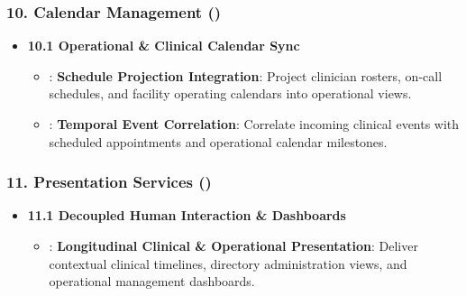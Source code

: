 \subsubsection*{10. Calendar Management (\texttt{})}
\label{rad:enabling:659}

\begin{itemize}

\item
\textbf{10.1 Operational \& Clinical Calendar Sync}


\begin{itemize}

\item
\texttt{}: \textbf{Schedule Projection Integration}: Project clinician rosters, on-call schedules, and facility operating calendars into operational views.



\item
\texttt{}: \textbf{Temporal Event Correlation}: Correlate incoming clinical events with scheduled appointments and operational calendar milestones.



\end{itemize}


\end{itemize}
\label{rad:enabling:663}
\subsubsection*{11. Presentation Services (\texttt{})}
\label{rad:enabling:664}

\begin{itemize}

\item
\textbf{11.1 Decoupled Human Interaction \& Dashboards}


\begin{itemize}

\item
\texttt{}: \textbf{Longitudinal Clinical \& Operational Presentation}: Deliver contextual clinical timelines, directory administration views, and operational management dashboards.



\end{itemize}


\end{itemize}
\label{rad:enabling:667}
